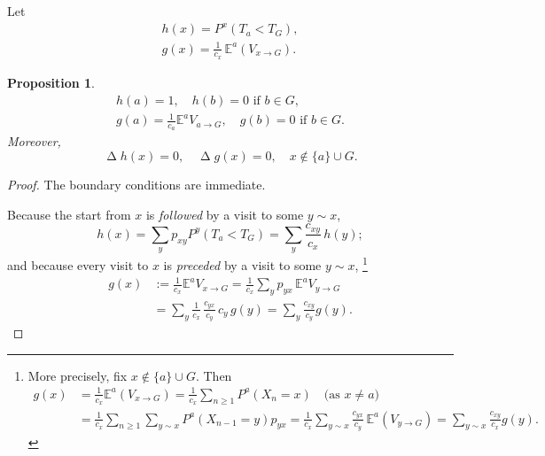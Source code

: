\documentclass[a4paper]{amsart}
\theoremstyle{plain}
\newtheorem{proposition}[theorem]{Proposition}
\theoremstyle{definition}
\theoremstyle{remark}
\DeclareMathOperator{\lap}{\Delta}
\begin{document}
\medskip 
Let
 \begin{gather}
 \boxed{h(x)  = P^x(T_a < T_G),}\label{dfh}\\
\boxed{g(x)  
=  \frac{1}{c_x}\, \mathbb{E}^a (V_{x\to G}).} \label{dfg}
\end{gather}



\begin{proposition}\label{hgprop}
\begin{equation} \label{bchg} 
\begin{gathered}
h(a) = 1,\quad  h(b) = 0\text{ if } b \in G,\\
g(a) = \frac{1}{c_a} \mathbb{E}^a V_{a\to G},
\quad  g(b) = 0\text{ if } b \in G.
\end{gathered} 
\end{equation} 
Moreover,   
\begin{equation} \label{prhar}
\lap h(x) = 0, \quad \lap g(x) = 0 , \quad x \notin \{a\}\cup G.
\end{equation} 
\end{proposition} 

\begin{proof} The boundary conditions are immediate.

\medskip 
Because the start from $ x $ is \emph{followed} by a visit to some  $y \sim  x $,
\begin{equation} \label{} 
h(x)   = \sum_y p_{xy} P^y (T_a < T_G) 
   = \sum_y \frac{c_{xy}}{c_x} \, h(y) ;
\end{equation} 
and because every visit to $ x $ is \emph{preceded} by a visit to some $ y \sim x $,%
\footnote{More precisely, fix $ x \notin \{a\}\cup G $. Then
\begin{align*}
g(x) &= \frac{1}{c_x} \mathbb{E}^a  (V_{x\to G}) 
      =  \frac{1}{c_x} \sum_{n \geq 1} P^a(X_n = x)\quad \text{(as  $x \neq a $) } \\
     &=  \frac{1}{c_x} \sum_{n \geq 1} \sum_{y\sim x} P^a(X_{n-1} = y) p_{yx} 
     =  \frac{1}{c_x}  \sum_{y\sim x} \frac{c_{yx}}{c_y}\, \mathbb{E}^a  (V_{y\to G}) 
     =   \sum_{y\sim x}  \frac{c_{xy}}{c_x}  g(y).
 \end{align*}
    }
\begin{equation} \label{hhg}
 \begin{aligned} 
 g(x) &:= \frac{1}{c_x}   \mathbb{E}^a V_{x\to G} = 
  \frac{1}{c_x} \sum_y p_{yx}\,  \mathbb{E}^a V_{y\to G}\\
 & = \sum_y\frac{1}{c_x}\, \frac{c_{yx}}{c_y} \, c_y\, g(y) =  \sum_y \frac{c_{xy}}{c_y}  g(y).  
\end{aligned} 
\end{equation}   \qedhere
\end{proof}   
\end{document}
